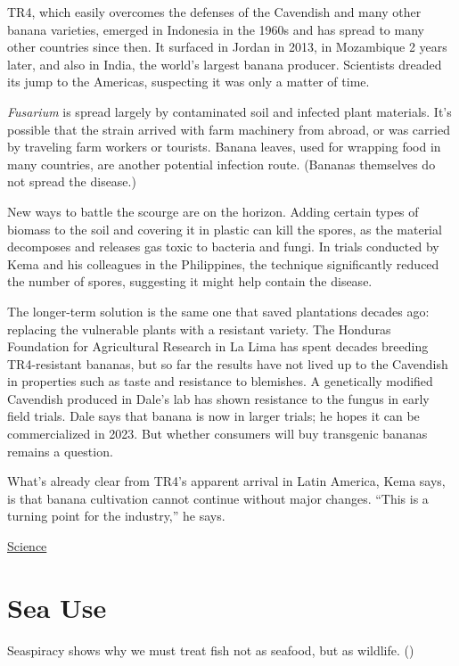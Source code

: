 \documentclass[
]{book}
\begin{document}
TR4, which easily overcomes the defenses of the Cavendish and many other banana varieties, emerged in Indonesia in the 1960s and has spread to many other countries since then. It surfaced in Jordan in 2013, in Mozambique 2 years later, and also in India, the world's largest banana producer. Scientists dreaded its jump to the Americas, suspecting it was only a matter of time.

\emph{Fusarium} is spread largely by contaminated soil and infected plant materials. It's possible that the strain arrived with farm machinery from abroad, or was carried by traveling farm workers or tourists. Banana leaves, used for wrapping food in many countries, are another potential infection route. (Bananas themselves do not spread the disease.)

New ways to battle the scourge are on the horizon. Adding certain types of biomass to the soil and covering it in plastic can kill the spores, as the material decomposes and releases gas toxic to bacteria and fungi. In trials conducted by Kema and his colleagues in the Philippines, the technique significantly reduced the number of spores, suggesting it might help contain the disease.

The longer-term solution is the same one that saved plantations decades ago: replacing the vulnerable plants with a resistant variety. The Honduras Foundation for Agricultural Research in La Lima has spent decades breeding TR4-resistant bananas, but so far the results have not lived up to the Cavendish in properties such as taste and resistance to blemishes. A genetically modified Cavendish produced in Dale's lab has shown resistance to the fungus in early field trials. Dale says that banana is now in larger trials; he hopes it can be commercialized in 2023. But whether consumers will buy transgenic bananas remains a question.

What's already clear from TR4's apparent arrival in Latin America, Kema says, is that banana cultivation cannot continue without major changes. ``This is a turning point for the industry,'' he says.

\href{https://www.sciencemag.org/news/2019/07/devastating-banana-disease-may-have-reached-latin-america-could-drive-global-prices}{Science}

\hypertarget{sea-use}{%
\chapter{Sea Use}\label{sea-use}}

Seaspiracy shows why we must treat fish not as seafood, but as wildlife.
(\citet{GeorgeMonbiot})
\end{document}
